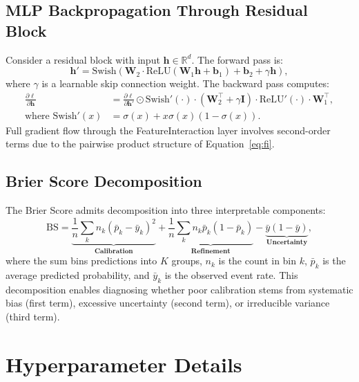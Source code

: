 \documentclass[12pt, a4paper]{article}
\begin{document}
\subsection{MLP Backpropagation Through Residual Block}

Consider a residual block with input $\mathbf{h} \in \mathbb{R}^d$. The forward pass is:
\begin{equation}
\mathbf{h}' = \text{Swish}\left( \mathbf{W}_2 \cdot \text{ReLU}(\mathbf{W}_1 \mathbf{h} + \mathbf{b}_1) + \mathbf{b}_2 + \gamma \mathbf{h} \right),
\end{equation}
where $\gamma$ is a learnable skip connection weight. The backward pass computes:
\begin{align}
\frac{\partial \ell}{\partial \mathbf{h}} &= \frac{\partial \ell}{\partial \mathbf{h}'} \odot \text{Swish}'(\cdot) \cdot \left( \mathbf{W}_2^\top + \gamma \mathbf{I} \right) \cdot \text{ReLU}'(\cdot) \cdot \mathbf{W}_1^\top, \\
\text{where } \text{Swish}'(x) &= \sigma(x) + x \sigma(x)(1 - \sigma(x)).
\end{align}
Full gradient flow through the FeatureInteraction layer involves second-order terms due to the pairwise product structure of Equation~\eqref{eq:fi}.

\subsection{Brier Score Decomposition}

The Brier Score admits decomposition into three interpretable components:
\begin{equation}
\text{BS} = \underbrace{\frac{1}{n}\sum_k n_k (\bar{p}_k - \bar{y}_k)^2}_{\textbf{Calibration}} 
+ \underbrace{\frac{1}{n}\sum_k n_k \bar{p}_k(1-\bar{p}_k)}_{\textbf{Refinement}} 
- \underbrace{\bar{y}(1-\bar{y})}_{\textbf{Uncertainty}},
\end{equation}
where the sum bins predictions into $K$ groups, $n_k$ is the count in bin $k$, $\bar{p}_k$ is the average predicted probability, and $\bar{y}_k$ is the observed event rate. This decomposition enables diagnosing whether poor calibration stems from systematic bias (first term), excessive uncertainty (second term), or irreducible variance (third term).


\section{Hyperparameter Details}\label{app:hparams}
\end{document}
